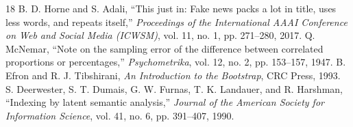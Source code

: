 \documentclass[conference]{IEEEtran}
\begin{document}
\begin{thebibliography}{18}
 B. D. Horne and S. Adali, ``This just in: Fake news packs a lot in title, uses less words, and repeats itself,'' \textit{Proceedings of the International AAAI Conference on Web and Social Media (ICWSM)}, vol. 11, no. 1, pp. 271--280, 2017.
 Q. McNemar, ``Note on the sampling error of the difference between correlated proportions or percentages,'' \textit{Psychometrika}, vol. 12, no. 2, pp. 153--157, 1947.
 B. Efron and R. J. Tibshirani, \textit{An Introduction to the Bootstrap}, CRC Press, 1993.
 S. Deerwester, S. T. Dumais, G. W. Furnas, T. K. Landauer, and R. Harshman, ``Indexing by latent semantic analysis,'' \textit{Journal of the American Society for Information Science}, vol. 41, no. 6, pp. 391--407, 1990.
\end{thebibliography}
\end{document}
